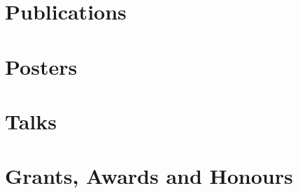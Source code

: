 \documentclass{mycv}
\begin{document}
\section{Publications}

\section{Posters}

\section{Talks}


\section{Grants, Awards and Honours}
\end{document}

